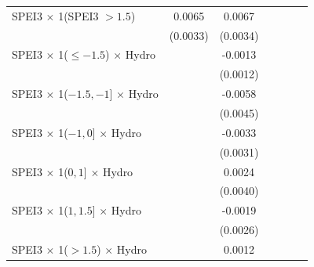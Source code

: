 {\begin{tabular}{l*{6}{c}}
\addlinespace
SPEI3 $\times$ 1(SPEI3 $> 1.5$)&      0.0065\sym{*}  &      0.0067\sym{*}  &                     &                     &                     &                     \\
                    &    (0.0033)         &    (0.0034)         &                     &                     &                     &                     \\
\addlinespace
SPEI3 $\times$ 1($\leq -1.5$) $\times$ Hydro&                     &     -0.0013         &                     &                     &                     &                     \\
                    &                     &    (0.0012)         &                     &                     &                     &                     \\
\addlinespace
SPEI3 $\times$ 1($-1.5,-1$] $\times$ Hydro&                     &     -0.0058         &                     &                     &                     &                     \\
                    &                     &    (0.0045)         &                     &                     &                     &                     \\
\addlinespace
SPEI3 $\times$ 1($-1,0$] $\times$ Hydro&                     &     -0.0033         &                     &                     &                     &                     \\
                    &                     &    (0.0031)         &                     &                     &                     &                     \\
\addlinespace
SPEI3 $\times$ 1($0,1$] $\times$ Hydro&                     &      0.0024         &                     &                     &                     &                     \\
                    &                     &    (0.0040)         &                     &                     &                     &                     \\
\addlinespace
SPEI3 $\times$ 1($1,1.5$] $\times$ Hydro&                     &     -0.0019         &                     &                     &                     &                     \\
                    &                     &    (0.0026)         &                     &                     &                     &                     \\
\addlinespace
SPEI3 $\times$ 1($> 1.5$) $\times$ Hydro&                     &      0.0012         &                     &                     &                     &                     \\

\end{tabular}}
